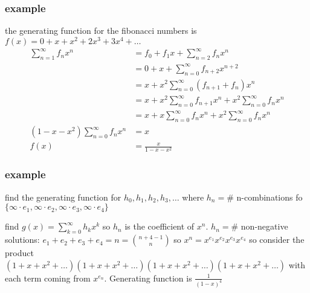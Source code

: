 \documentclass{article}
\begin{document}
\subsubsection*{example}
the generating function for the fibonacci numbers is $f(x)=0+x+x^2+2x^3+3x^4+\dots$
\begin{align*}
  \sum\limits_{n=1}^\infty{f_nx^n}&=f_0+f_1x+\sum\limits_{n=2}^\infty{f_nx^n}\\
  &=0+x+\sum\limits_{n=0}^\infty{f_{n+2}x^{n+2}}\\
  &=x+x^2\sum\limits_{n=0}^\infty{(f_{n+1}+f_n)x^n}\\
  &=x+x^2\sum\limits_{n=0}^\infty{f_{n+1}x^n}+x^2\sum\limits_{n=0}^\infty{f_nx^n}\\
  &=x+x\sum\limits_{n=0}^\infty{f_{n}x^n}+x^2\sum\limits_{n=0}^\infty{f_nx^n}\\
  (1-x-x^2)\sum\limits_{n=0}^\infty{f_{n}x^n}&=x\\
  f(x)&=\frac{x}{1-x-x^2}
\end{align*}
\subsubsection*{example}
find the generating function for $h_0,h_1,h_2,h_3,\dots$ where $h_n=\#$ n-combinations fo $\{\infty\cdot e_1,\infty\cdot e_2,\infty\cdot e_3,\infty\cdot e_4\}$

find $g(x)=\sum\limits_{k=0}^\infty{h_kx^k}$ so $h_n$ is the coefficient of $x^n$. $h_n=\#$ non-negative solutions: $e_1+e_2+e_3+e_4=n=\binom{n+4-1}{n}$ so $x^n=x^{e_1}x^{e_2}x^{e_3}x^{e_4}$ so consider the product $(1+x+x^2+\dots)(1+x+x^2+\dots)(1+x+x^2+\dots)(1+x+x^2+\dots)$ with each term coming from $x^{e_n}$. Generating function is $\frac{1}{(1-x)^4}$
\end{document}
